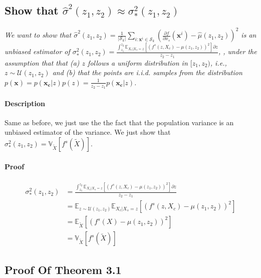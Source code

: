 \documentclass[twoside]{article}
\newcommand{\dfdx}{\frac{\partial f}{\partial x_s}}
\newcommand{\xc}{\mathbf{x_c}}
\newcommand{\xb}{\mathbf{x}}
\begin{document}
\subsection{Show that \(\hat{\sigma}^2(z_1, z_2) \approx  \sigma_*^2(z_1, z_2)\)}

\textit{We want to show that \(\hat{\sigma}^2(z_1, z_2) = \frac{1}{|\mathcal{S}_k|}
\sum_{i:\mathbf{x}^i \in \mathcal{S}_k} \left ( \dfdx(\mathbf{x}^i) -
  \hat{\mu}(z_1, z_2) \right )^2\) is an unbiased
estimator of
\(\sigma^2_*(z_1, z_2) = \frac{\int_{z_1}^{z_2} \mathbb{E}_{X_c|X_s=z}
  \left [ (f^s(z, X_c) - \mu(z_1, z_2) )^2 \right] \partial z}{z_2 -
  z_1} \), , under the
  assumption that that (a) \(z\) follows a uniform distribution in
  \([z_1, z_2)\), i.e., \(z \sim \mathcal{U}(z_1, z_2)\) and (b) that
  the points are i.i.d.  samples from the distribution
  \(p(\xb) = p(\xc|z)p(z) = \frac{1}{z_2-z_1}p(\xc|z) \).}

\paragraph{Description}
Same as before, we just use the the fact that the population variance
is an unbiased estimator of the variance. We just show that
\(\sigma^2_*(z_1, z_2) = \mathbb{V}_{\tilde{X}} [f^s(\tilde{X})]\).

\paragraph{Proof}


\begin{align}
  \sigma^2_*(z_1, z_2) & = \frac{\int_{z_1}^{z_2} \mathbb{E}_{X_c|X_s=z}
                         \left [ (f^s(z, X_c) - \mu(z_1, z_2) )^2 \right] \partial z}{z_2 -
                         z_1} \\
                       & = \mathbb{E}_{z \sim \mathcal{U}(z_1, z_2)}\mathbb{E}_{X_c|X_s=z}
                         \left [ (f^s(z, X_c) - \mu(z_1, z_2) )^2 \right] \\
                       & = \mathbb{E}_{\tilde{X}} \left [ (f^s(X) - \mu(z_1, z_2) )^2 \right]\\
                       & = \mathbb{V}_{\tilde{X}} [f^s(\tilde{X})]
  \end{align}


\subsection{Proof Of Theorem 3.1}
\end{document}
